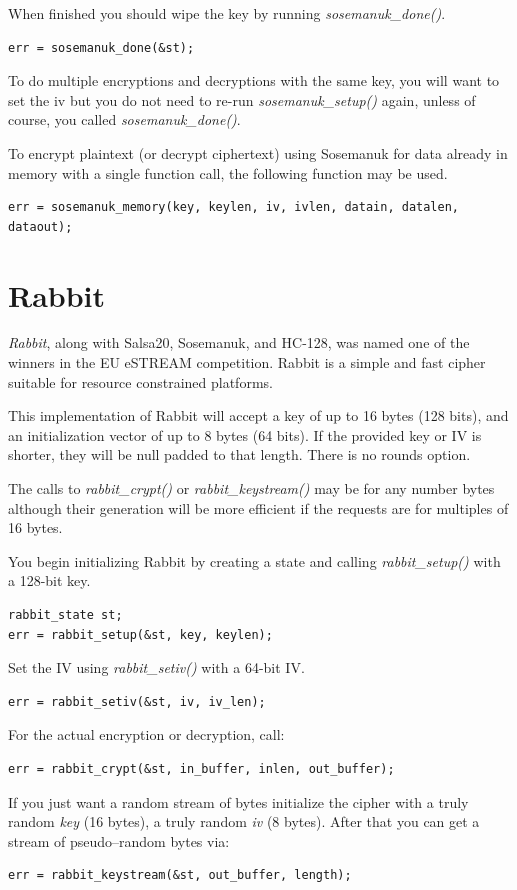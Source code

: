 \documentclass[synpaper]{book}
\newcommand{\mysection}[1]    %
	{                   %
	\section{#1}
   \markboth{\textsf{www.libtom.net}}{\thesection ~ {#1}}
	}
\begin{document}
When finished you should wipe the key by running \textit{sosemanuk\_done()}.
\begin{verbatim}
err = sosemanuk_done(&st);
\end{verbatim}

To do multiple encryptions and decryptions with the same key, you will want to set the iv but
you do not need to re-run \textit{sosemanuk\_setup()} again, unless of course, you called
\textit{sosemanuk\_done()}.

To encrypt plaintext (or decrypt ciphertext) using Sosemanuk for data already in
memory with a single function call, the following function may be used.
\begin{verbatim}
err = sosemanuk_memory(key, keylen, iv, ivlen, datain, datalen, dataout);
\end{verbatim}

\mysection{Rabbit}

\textit{Rabbit}, along with Salsa20, Sosemanuk, and HC-128, was named one of the winners
in the EU eSTREAM competition.  Rabbit is a simple and fast cipher suitable for resource
constrained platforms.

This implementation of Rabbit will accept a key of up to 16 bytes (128 bits), and an
initialization vector of up to 8 bytes (64 bits).  If the provided key or IV is shorter,
they will be null padded to that length.  There is no rounds option.

The calls to \textit{rabbit\_crypt()} or \textit{rabbit\_keystream()} may be for any
number bytes although their generation will be more efficient if the requests are for
multiples of 16 bytes.

You begin initializing Rabbit by creating a state and calling \textit{rabbit\_setup()}
with a 128-bit key.
\begin{verbatim}
rabbit_state st;
err = rabbit_setup(&st, key, keylen);
\end{verbatim}

Set the IV using \textit{rabbit\_setiv()} with a 64-bit IV.
\begin{verbatim}
err = rabbit_setiv(&st, iv, iv_len);
\end{verbatim}

For the actual encryption or decryption, call:
\begin{verbatim}
err = rabbit_crypt(&st, in_buffer, inlen, out_buffer);
\end{verbatim}

If you just want a random stream of bytes initialize the cipher with a truly random \textit{key}
(16 bytes), a truly random \textit{iv} (8 bytes). After that you can
get a stream of pseudo--random bytes via:
\begin{verbatim}
err = rabbit_keystream(&st, out_buffer, length);
\end{verbatim}
\end{document}
